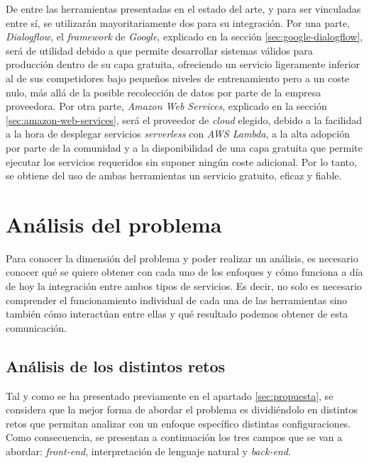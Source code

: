 \documentclass[11pt,spanish,listoffigures]{tfgetsinf}
\begin{document}
De entre las herramientas presentadas en el estado del arte, y para ser vinculadas entre sí, se utilizarán mayoritariamente dos para su integración. Por una parte, \textit{Dialogflow}, el \textit{framework} de \textit{Google}, explicado en la sección \ref{sec:google-dialogflow}, será de utilidad debido a que permite desarrollar sistemas válidos para producción dentro de su capa gratuita, ofreciendo un servicio ligeramente inferior al de sus competidores bajo pequeños niveles de entrenamiento pero a un coste nulo, más allá de la posible recolección de datos por parte de la empresa proveedora. Por otra parte, \textit{Amazon Web Services}, explicado en la sección \ref{sec:amazon-web-services}, será el proveedor de \textit{cloud} elegido, debido a la facilidad a la hora de desplegar servicios \textit{serverless} con \textit{AWS Lambda}, a la alta adopción por parte de la comunidad y a la disponibilidad de una capa gratuita que permite ejecutar los servicios requeridos sin suponer ningún coste adicional. Por lo tanto, se obtiene del uso de ambas herramientas un servicio gratuito, eficaz y fiable.




\chapter{Análisis del problema}
\label{ch:analisis-problema}

Para conocer la dimensión del problema y poder realizar un análisis, es necesario conocer qué se quiere obtener con cada uno de los enfoques y cómo funciona a día de hoy la integración entre ambos tipos de servicios. Es decir, no solo es necesario comprender el funcionamiento individual de cada una de las herramientas sino también cómo interactúan entre ellas y qué resultado podemos obtener de esta comunicación.

\section{Análisis de los distintos retos}
\label{sec:analisis-jupyter}

Tal y como se ha presentado previamente en el apartado \ref{sec:propuesta}, se considera que la mejor forma de abordar el problema es dividiéndolo en distintos retos que permitan analizar con un enfoque específico distintas configuraciones. Como consecuencia, se presentan a continuación los tres campos que se van a abordar: \textit{front-end}, interpretación de lenguaje natural y \textit{back-end}.
\end{document}
